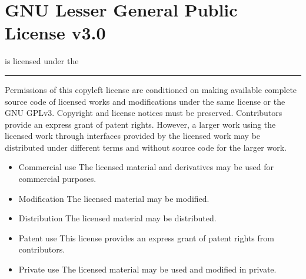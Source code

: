 \documentclass[letterpaper,10pt,english]{sphinxmanual}
\begin{document}
\chapter{GNU Lesser General Public License v3.0}
\label{\detokenize{examples/lgpl-3.0:gnu-lesser-general-public-license-v3-0}}\label{\detokenize{examples/lgpl-3.0::doc}}
 is licensed under the 



\bigskip\hrule\bigskip



Permissions of this copyleft license are conditioned on making available complete source code of licensed works and modifications under the same license or the GNU GPLv3. Copyright and license notices must be preserved. Contributors provide an express grant of patent rights. However, a larger work using the licensed work through interfaces provided by the licensed work may be distributed under different terms and without source code for the larger work.

\vspace{10px}

\begin{itemize}
\item {}
Commercial use \textendash{} The licensed material and derivatives may be used for commercial purposes.

\item {}
Modification \textendash{} The licensed material may be modified.

\item {}
Distribution \textendash{} The licensed material may be distributed.

\item {}
Patent use \textendash{} This license provides an express grant of patent rights from contributors.

\item {}
Private use \textendash{} The licensed material may be used and modified in private.

\end{itemize}

\vspace{10px}
\end{document}
